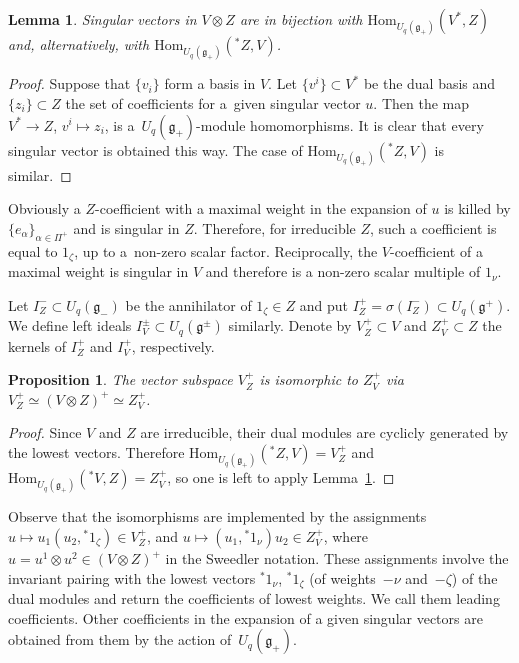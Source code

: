 \documentclass[11pt]{article}
\numberwithin{equation}{section}
\newtheorem{Lemma}[Theorem]{Lemma}
\newtheorem{Proposition}[Theorem]{Proposition}
 { \theoremstyle{definition}
\newtheorem{Definition}[Theorem]{Definition}
\newtheorem{Example}[Theorem]{Example}
\newtheorem{Remark}[Theorem]{Remark} }
\begin{document}
\begin{Lemma}\label{duality}Singular vectors in $V\otimes Z$ are in bijection with $\mathrm{Hom}_{U_q(\mathfrak{g}_+)}(V^*,Z)$ and, alternatively, with $\mathrm{Hom}_{U_q(\mathfrak{g}_+)}({}^*\!Z,V)$.
\end{Lemma}
\begin{proof}Suppose that $\{v_i\}$ form a basis in $V$. Let $\{v^i\}\subset V^*$ be the dual basis and $\{z_i\}\subset Z$ the set of coefficients for a~given singular vector $u$. Then the map $V^*\to Z$, $v^i\mapsto z_i$, is a~$U_q(\mathfrak{g}_+)$-module homomorphisms. It is clear that every singular vector is obtained this way. The case of $\mathrm{Hom}_{U_q(\mathfrak{g}_+)}({}^*\!Z,V)$ is similar.
\end{proof}

Obviously a $Z$-coefficient with a maximal weight in the expansion of $u$ is killed by $\{e_\alpha\}_{\alpha \in \Pi^+}$ and is singular in $Z$. Therefore, for irreducible $Z$, such a coefficient is equal to $1_\zeta$, up to a~non-zero scalar factor. Reciprocally, the $V$-coefficient of a maximal weight is singular in $V$ and therefore is a non-zero scalar multiple of $1_\nu$.

Let $I^-_Z\subset U_q(\mathfrak{g}_-)$ be the annihilator of $1_\zeta\in Z$ and put $I^+_Z=\sigma(I^-_Z)\subset U_q(\mathfrak{g}^+)$. We define left ideals $I^\pm_V \subset U_q(\mathfrak{g}^\pm)$ similarly. Denote by $V^+_Z\subset V$ and $Z^+_V\subset Z$ the kernels of $I^+_Z$ and $I^+_V$, respectively.
\begin{Proposition}\label{V-Z-extr}The vector subspace $V^+_Z$ is isomorphic to $Z^+_V$ via $V^+_Z\simeq (V\otimes Z)^+\simeq Z^+_V$.
\end{Proposition}
\begin{proof}Since $V$ and $Z$ are irreducible, their dual modules are cyclicly generated by the lowest vectors. Therefore $\mathrm{Hom}_{U_q(\mathfrak{g}_+)}({}^*\!Z,V)=V^+_Z$ and $\mathrm{Hom}_{U_q(\mathfrak{g}_+)}({}^*\!V,Z)=Z^+_V$, so one is left to apply Lemma~\ref{duality}.
\end{proof}

Observe that the isomorphisms are implemented by the assignments $u\mapsto u_1 (u_2, {}^*\!1_{\zeta})\in V^+_Z$, and $u\mapsto ( u_1, {}^*\!1_{\nu}) u_2 \in Z^+_V$, where $u=u^1\otimes u^2\in (V\otimes Z)^+$ in the Sweedler notation. These assignments involve the invariant pairing with the lowest vectors ${}^*\!1_{\nu}$, ${}^*\!1_{\zeta}$ (of weights~$-\nu$ and~$-\zeta$) of the dual modules and return the coefficients of lowest weights. We call them leading coefficients. Other coefficients in the expansion of a given singular vectors are obtained from them by the action of~$U_q(\mathfrak{g}_+)$.
\end{document}
